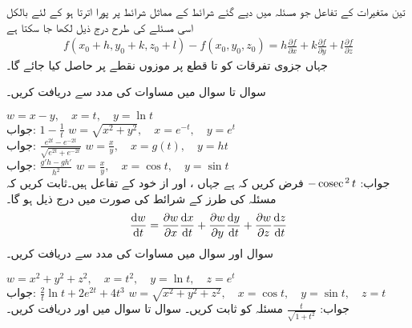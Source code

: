 تین متغیرات کے تفاعل  جو مسئلہ  میں دیے گئے شرائط کے مماثل شرائط پر پورا اترتا ہو کے لئے بالکل اسی مسئلے کی طرح درج ذیل لکھا جا سکتا ہے
\begin{align}\label{مساوات_الاحصاء_مسئلہ_زنجیری_ت}
f(x_0+h,y_0+k,z_0+l)-f(x_0,y_0,z_0)=h\frac{\partial f}{\partial x}+k\frac{\partial f}{\partial y}+l\frac{\partial f}{\partial z}
\end{align}
جہاں جزوی تفرقات کو  تا  قطع پر موزوں نقطے پر حاصل کیا جائے گا۔

سوال  تا سوال  میں مساوات  کی مدد سے  دریافت کریں۔

\quad
$w=x-y,\quad x=t,\quad y=\ln t$\\
جواب:
$1-\tfrac{1}{t}$
\quad
$w=\sqrt{x^2+y^2},\quad x=e^{-t},\quad y=e^{t}$\\
جواب:
$\tfrac{e^{2t}-e^{-2t}}{\sqrt{e^{2t}+e^{-2t}}}$
\quad
$w=\tfrac{x}{y},\quad x=g(t),\quad y=h{t}$\\
جواب:
$\tfrac{g'h-gh'}{h^2}$
\quad
$w=\tfrac{x}{y},\quad x=\cos t,\quad y=\sin t$\\
جواب:
$-\operatorname{cosec}^{\,2} t$
فرض کریں کہ  ہے جہاں ،  اور  از خود  کے تفاعل ہیں۔ثابت کریں کہ مسئلہ  کی طرز کے شرائط کی صورت میں درج ذیل ہو گا۔
\begin{align}\label{مساوات_الاحصاء_زنجیری_تین_متغیرات}
\frac{\dif w}{\dif t}=\frac{\partial w}{\partial x}\frac{\dif x}{\dif t}+\frac{\partial w}{\partial y}\frac{\dif y}{\dif t}+\frac{\partial w}{\partial z}\frac{\dif z}{\dif t}
\end{align}
سوال  اور سوال  میں مساوات  کی مدد سے  دریافت کریں۔

\quad
$w=x^2+y^2+z^2,\quad x=t^2,\quad y=\ln t,\quad z=e^t$\\
جواب:
$\tfrac{2}{t}\ln t+2e^{2t}+4t^3$
\quad
$w=\sqrt{x^2+y^2+z^2},\quad x=\cos t,\quad y=\sin t,\quad z=t$\\
جواب:
$\tfrac{t}{\sqrt{1+t^2}}$
مسئلہ  کو ثابت کریں۔
سوال  تا سوال  میں  اور  دریافت کریں۔

